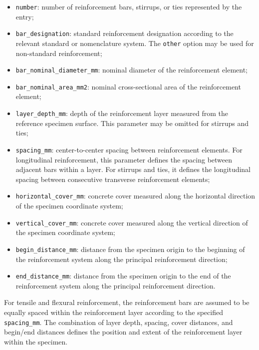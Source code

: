 \documentclass[11pt]{book}
\begin{document}
\begin{itemize}

    \item \texttt{number}: number of reinforcement bars, stirrups, or ties represented by the entry;

    \item \texttt{bar\_designation}: standard reinforcement designation according to the relevant standard or nomenclature system. The \texttt{other} option may be used for non-standard reinforcement;

    \item \texttt{bar\_nominal\_diameter\_mm}: nominal diameter of the reinforcement element;

    \item \texttt{bar\_nominal\_area\_mm2}: nominal cross-sectional area of the reinforcement element;

    \item \texttt{layer\_depth\_mm}: depth of the reinforcement layer measured from the reference specimen surface. This parameter may be omitted for stirrups and ties;

    \item \texttt{spacing\_mm}: center-to-center spacing between reinforcement elements. For longitudinal reinforcement, this parameter defines the spacing between adjacent bars within a layer. For stirrups and ties, it defines the longitudinal spacing between consecutive transverse reinforcement elements;

    \item \texttt{horizontal\_cover\_mm}: concrete cover measured along the horizontal direction of the specimen coordinate system;

    \item \texttt{vertical\_cover\_mm}: concrete cover measured along the vertical direction of the specimen coordinate system;

    \item \texttt{begin\_distance\_mm}: distance from the specimen origin to the beginning of the reinforcement system along the principal reinforcement direction;

    \item \texttt{end\_distance\_mm}: distance from the specimen origin to the end of the reinforcement system along the principal reinforcement direction.

\end{itemize}

For tensile and flexural reinforcement, the reinforcement bars are assumed to be equally spaced within the reinforcement layer according to the specified \texttt{spacing\_mm}. The combination of layer depth, spacing, cover distances, and begin/end distances defines the position and extent of the reinforcement layer within the specimen.
\end{document}

